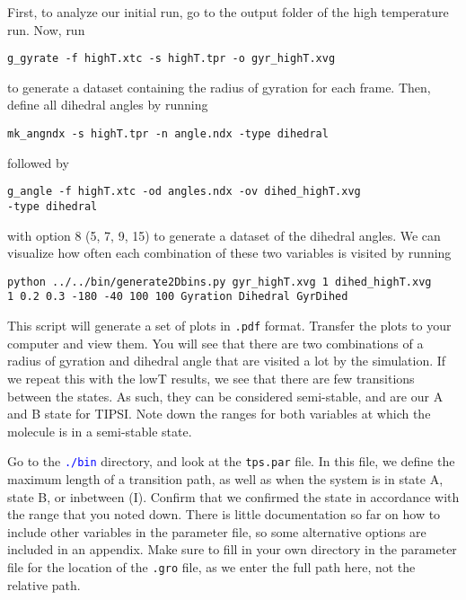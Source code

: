 \documentclass[]{article}
\begin{document}
First, to analyze our initial run, go to the output folder of the high temperature run. Now, run
%
\begin{lstlisting}
g_gyrate -f highT.xtc -s highT.tpr -o gyr_highT.xvg
\end{lstlisting}
%
to generate a dataset containing the radius of gyration for each frame. Then, define all dihedral angles by running
%
\begin{lstlisting}
mk_angndx -s highT.tpr -n angle.ndx -type dihedral
\end{lstlisting}
%
followed by
%
\begin{lstlisting}
g_angle -f highT.xtc -od angles.ndx -ov dihed_highT.xvg 
-type dihedral
\end{lstlisting}
%
with option 8 (5, 7, 9, 15) to generate a dataset of the dihedral angles. We can visualize how often each combination of these two variables is visited by running
%
\begin{lstlisting}
python ../../bin/generate2Dbins.py gyr_highT.xvg 1 dihed_highT.xvg 
1 0.2 0.3 -180 -40 100 100 Gyration Dihedral GyrDihed
\end{lstlisting}
%
This script will generate a set of plots in \texttt{.pdf} format. Transfer the plots to your computer and view them. You will see that there are two combinations of a radius of gyration and dihedral angle that are visited a lot by the simulation. If we repeat this with the lowT results, we see that there are few transitions between the states. As such, they can be considered semi-stable, and are our A and B state for \textsc{TIPSI}. Note down the ranges for both variables at which the molecule is in a semi-stable state.

Go to the \textcolor{blue}{\texttt{./bin}} directory, and look at the \texttt{tps.par} file. In this file, we define the maximum length of a transition path, as well as when the system is in state A, state B, or inbetween (I). Confirm that we confirmed the state in accordance with the range that you noted down. There is little documentation so far on how to include other variables in the parameter file, so some alternative options are included in an appendix. Make sure to fill in your own directory in the parameter file for the location of the \texttt{.gro} file, as we enter the full path here, not the relative path.
\end{document}
